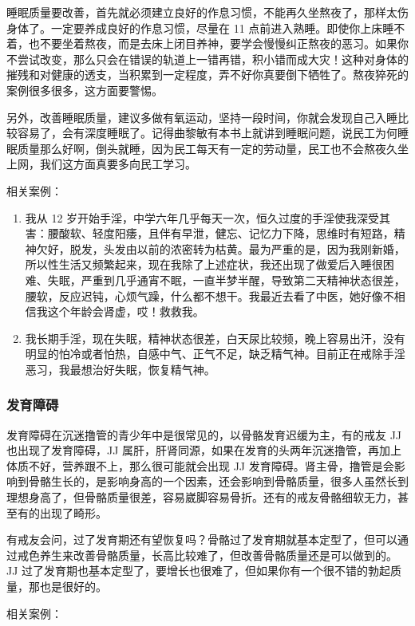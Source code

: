 \documentclass[fontset=founder]{ctexart}
\begin{document}
睡眠质量要改善，首先就必须建立良好的作息习惯，不能再久坐熬夜了，那样太伤身体了。一定要养成良好的作息习惯，尽量在 11 点前进入熟睡。即使你上床睡不着，也不要坐着熬夜，而是去床上闭目养神，要学会慢慢纠正熬夜的恶习。如果你不尝试改变，那么只会在错误的轨道上一错再错，积小错而成大灾！这种对身体的摧残和对健康的透支，当积累到一定程度，弄不好你真要倒下牺牲了。熬夜猝死的案例很多很多，这方面要警惕。

另外，改善睡眠质量，建议多做有氧运动，坚持一段时间，你就会发现自己入睡比较容易了，会有深度睡眠了。记得曲黎敏有本书上就讲到睡眠问题，说民工为何睡眠质量那么好啊，倒头就睡，因为民工每天有一定的劳动量，民工也不会熬夜久坐上网，我们这方面真要多向民工学习。

相关案例：

\begin{enumerate}
    \item 我从 12 岁开始手淫，中学六年几乎每天一次，恒久过度的手淫使我深受其害：腰酸软、轻度阳痿，且伴有早泄，健忘、记忆力下降，思维时有短路，精神欠好，脱发，头发由以前的浓密转为枯黄。最为严重的是，因为我刚新婚，所以性生活又频繁起来，现在我除了上述症状，我还出现了做爱后入睡很困难、失眠，严重到几乎通宵不眠，一直半梦半醒，导致第二天精神状态很差，腰软，反应迟钝，心烦气躁，什么都不想干。我最近去看了中医，她好像不相信我这个年龄会肾虚，哎！救救我。
    \item 我长期手淫，现在失眠，精神状态很差，白天尿比较频，晚上容易出汗，没有明显的怕冷或者怕热，自感中气、正气不足，缺乏精气神。目前正在戒除手淫恶习，我最想治好失眠，恢复精气神。
\end{enumerate}

\subsubsection{发育障碍}

发育障碍在沉迷撸管的青少年中是很常见的，以骨骼发育迟缓为主，有的戒友 JJ 也出现了发育障碍，JJ 属肝，肝肾同源，如果在发育的头两年沉迷撸管，再加上体质不好，营养跟不上，那么很可能就会出现 JJ 发育障碍。肾主骨，撸管是会影响到骨骼生长的，是影响身高的一个因素，还会影响到骨骼质量，很多人虽然长到理想身高了，但骨骼质量很差，容易崴脚容易骨折。还有的戒友骨骼细软无力，甚至有的出现了畸形。

有戒友会问，过了发育期还有望恢复吗？骨骼过了发育期就基本定型了，但可以通过戒色养生来改善骨骼质量，长高比较难了，但改善骨骼质量还是可以做到的。JJ 过了发育期也基本定型了，要增长也很难了，但如果你有一个很不错的勃起质量，那也是很好的。

相关案例：
\end{document}

